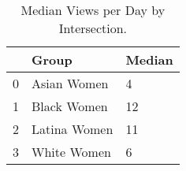 \begin{table}[htbp]
\centering
\caption{Median Views per Day by Intersection.}
\label{tab:eda_views_per_day_by_group}
\begin{tabular}{lll}
\toprule
 & Group & Median \\
\midrule
0 & Asian Women & 4 \\
1 & Black Women & 12 \\
2 & Latina Women & 11 \\
3 & White Women & 6 \\
\bottomrule
\end{tabular}

\end{table}